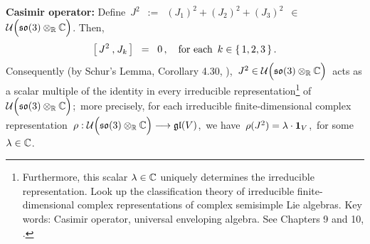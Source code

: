 \begin{proposition}
\begin{enumerate}
	\textbf{Casimir operator:}\;\;
	Define
	\,$J^{2}$
	\,$:=$\,
	$(J_{1})^{2} + (J_{2})^{2} + (J_{3})^{2}$
	\,$\in$\
	 $\mathcal{U}\!\left(\mathfrak{so}(3) \overset{{\color{white}.}}{\otimes_{\Re}} \C\right)$.
	Then,
	\begin{equation*}
	\left[\,J^{2}\,\overset{{\color{white}1}}{,}\,J_{k}\,\right]
	\;\; = \;\;
		0\,,
	\quad
	\textnormal{for each \,$k \in \{\,1,2,3\,\}$}\,.
	\end{equation*}
	Consequently (by Schur's Lemma, Corollary 4.30, \cite{Hall2015}), 
	\,$J^{2} \in \mathcal{U}\!\left(\mathfrak{so}(3) \overset{{\color{white}.}}{\otimes_{\Re}} \C\right)$\,
	acts as a scalar multiple of the identity in every irreducible
	representation\footnote{Furthermore, this scalar $\lambda \in \mathbb{C}$ uniquely determines
	the irreducible representation.
	Look up the classification theory of irreducible finite-dimensional complex representations
	of complex semisimple Lie algebras.
	Key words: Casimir operator, universal enveloping algebra. See Chapters 9 and 10, \cite{Hall2015}.}
	of \,$\mathcal{U}\!\left(\mathfrak{so}(3) \overset{{\color{white}.}}{\otimes_{\Re}} \C\right)$;\,
	more precisely, for each irreducible finite-dimensional complex representation
	\,$\rho : \mathcal{U}\!\left(\mathfrak{so}(3) \overset{{\color{white}.}}{\otimes_{\Re}} \C\right) \longrightarrow \mathfrak{gl}(V)$,\,
	we have \,$\rho(J^{2}) = \lambda \cdot \textnormal{\textbf{1}}_{V}$,\,
	for some \,$\lambda \in \mathbb{C}$.
\end{enumerate}
\end{proposition}


